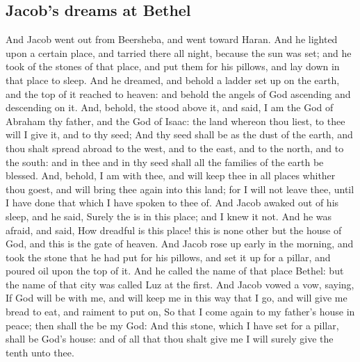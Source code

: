 \begin{biblechapter}
\section*{Jacob's dreams at Bethel}
\verse And Jacob went out from Beersheba, and went toward Haran.
\verse And he lighted upon a certain place, and tarried there all night, because the sun was set; and he took of the stones of that place, and put them for his pillows, and lay down in that place to sleep.
\verse And he dreamed, and behold a ladder set up on the earth, and the top of it reached to heaven: and behold the angels of God ascending and descending on it.
\verse And, behold, the \LORD stood above it, and said, I am the \LORD God of Abraham thy father, and the God of Isaac: the land whereon thou liest, to thee will I give it, and to thy seed;
\verse And thy seed shall be as the dust of the earth, and thou shalt spread abroad to the west, and to the east, and to the north, and to the south: and in thee and in thy seed shall all the families of the earth be blessed.
\verse And, behold, I am with thee, and will keep thee in all places whither thou goest, and will bring thee again into this land; for I will not leave thee, until I have done that which I have spoken to thee of.
\verse And Jacob awaked out of his sleep, and he said, Surely the \LORD is in this place; and I knew it not.
\verse And he was afraid, and said, How dreadful is this place! this is none other but the house of God, and this is the gate of heaven.
\verse And Jacob rose up early in the morning, and took the stone that he had put for his pillows, and set it up for a pillar, and poured oil upon the top of it.
\verse And he called the name of that place Bethel: but the name of that city was called Luz at the first.
\verse And Jacob vowed a vow, saying, If God will be with me, and will keep me in this way that I go, and will give me bread to eat, and raiment to put on,
\verse So that I come again to my father's house in peace; then shall the \LORD be my God:
\verse And this stone, which I have set for a pillar, shall be God's house: and of all that thou shalt give me I will surely give the tenth unto thee.
\end{biblechapter}

